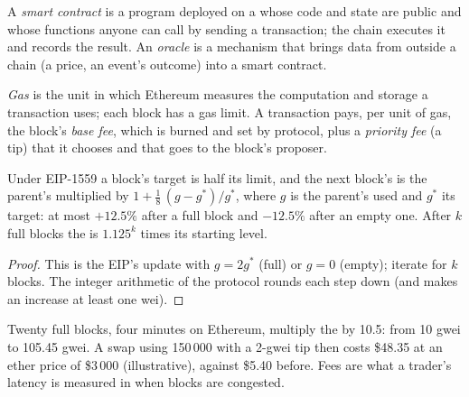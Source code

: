 \begin{definition}\label{def:m3:blockchains-for-traders:contract}
A \emph{smart contract} is a program deployed on a  whose code and state
are public and whose functions anyone can call by sending a transaction; the chain executes it and records
the result. An \emph{oracle} is a mechanism that brings data from outside a chain (a price,
an event's outcome) into a smart contract.
\end{definition}

\begin{definition}\label{def:m3:blockchains-for-traders:gas}
\emph{Gas} is the unit in which Ethereum measures the computation and storage a transaction
uses; each block has a gas limit. A transaction pays, per unit of gas, the block's \emph{base
fee}, which is burned and set by protocol, plus a \emph{priority fee}
(a tip) that it chooses and that goes to the block's proposer.
\end{definition}

\begin{proposition}\label{prop:m3:blockchains-for-traders:basefee}
Under EIP-1559 a block's  target is half its limit, and the next block's  is the parent's
multiplied by $1 + \tfrac18\,(g - g^{*})/g^{*}$, where $g$ is the parent's  used and $g^{*}$ its target:
at most $+12.5\%$ after a full block and $-12.5\%$ after an empty one. After $k$ full blocks the  is
$1.125^k$ times its starting level.
\end{proposition}

\begin{proof}
This is the EIP's update with $g = 2g^{*}$ (full) or $g = 0$ (empty); iterate for $k$ blocks. The integer
arithmetic of the protocol rounds each step down (and makes an increase at least one wei).
\end{proof}

Twenty full blocks, four minutes on Ethereum, multiply the  by 10.5: from 10 gwei to 105.45 gwei. A
swap using 150\,000  with a 2-gwei tip then costs \$48.35 at an ether price of \$3\,000 (illustrative),
against \$5.40 before. Fees are what a trader's latency is measured in when blocks are congested.

